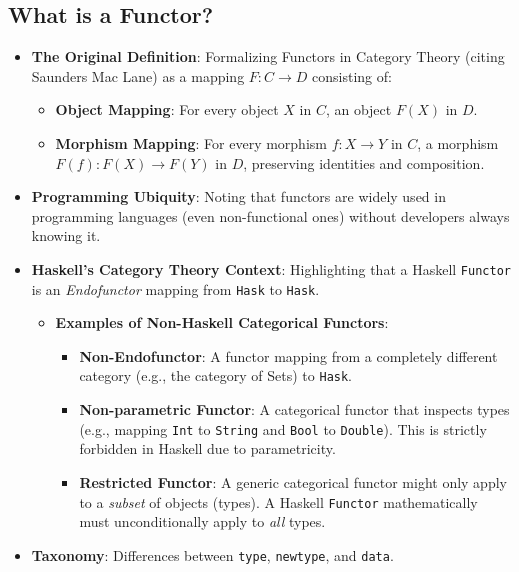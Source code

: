 \documentclass[12pt,a4paper]{article}
\begin{document}
\subsection{What is a Functor?}
\begin{itemize}
    \item \textbf{The Original Definition}: Formalizing Functors in Category Theory (citing Saunders Mac Lane) as a mapping $F: C \to D$ consisting of:
    \begin{itemize}
        \item \textbf{Object Mapping}: For every object $X$ in $C$, an object $F(X)$ in $D$.
        \item \textbf{Morphism Mapping}: For every morphism $f: X \to Y$ in $C$, a morphism $F(f): F(X) \to F(Y)$ in $D$, preserving identities and composition.
    \end{itemize}
    \item \textbf{Programming Ubiquity}: Noting that functors are widely used in programming languages (even non-functional ones) without developers always knowing it.
    \item \textbf{Haskell's Category Theory Context}: Highlighting that a Haskell \texttt{Functor} is an \textit{Endofunctor} mapping from \texttt{Hask} to \texttt{Hask}.
    \begin{itemize}
        \item \textbf{Examples of Non-Haskell Categorical Functors}:
        \begin{itemize}
            \item \textbf{Non-Endofunctor}: A functor mapping from a completely different category (e.g., the category of Sets) to \texttt{Hask}.
            \item \textbf{Non-parametric Functor}: A categorical functor that inspects types (e.g., mapping \texttt{Int} to \texttt{String} and \texttt{Bool} to \texttt{Double}). This is strictly forbidden in Haskell due to parametricity.
            \item \textbf{Restricted Functor}: A generic categorical functor might only apply to a \textit{subset} of objects (types). A Haskell \texttt{Functor} mathematically must unconditionally apply to \textit{all} types.
        \end{itemize}
    \end{itemize}
    \item \textbf{Taxonomy}: Differences between \texttt{type}, \texttt{newtype}, and \texttt{data}.
\end{itemize}
\end{document}

